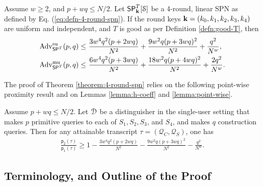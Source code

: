 \documentclass[journal=tosc,final,nohyperref]{iacrtrans}
\begin{document}
\begin{theorem}
	\label{theorem:4-round-spn}
	
	Assume $w\geq2$, and $p+wq\leq N/2$. Let $\mathsf{SP}_{\mathbf{k}}^T[\mathcal{S}]$ be a 4-round, linear SPN as defined by Eq. (\ref{eq:defn-4-round-spn}). If the round keys $\mathbf{k}=(k_0,k_1,k_2,k_3,k_4)$ are uniform and independent, and $T$ is good as per Definition \ref{defn:good-T}, then
	\begin{align}
	\operatorname{Adv}_{\mathsf{SP}^T}^{\mathrm{su}}(p, q) \leq~& 	\frac{3w^4q^2(p+2wq)}{N^2}+\frac{9w^2q(p+3wq)^2}{N^2}+\frac{q^2}{N^w},   
	\notag   \\
	\operatorname{Adv}_{\mathsf{SP}^T}^{\mathrm{mu}}(p, q) \leq~& \frac{6w^4q^2(p+3wq)}{N^2}+\frac{18w^2q(p+4wq)^2}{N^2}+\frac{2q^2}{N^w}.
	\notag
	\end{align}
\end{theorem}
The proof of Theorem \ref{theorem:4-round-spn} relies on the following point-wise proximity result and on Lemmas \ref{lemma:h-coeff} and \ref{lemma:point-wise}.


\begin{lemma}
	\label{lemma:proximity-4-round}
	
	Assume $p+wq\leq N/2$. Let $\mathcal{D}$ be a distinguisher in the single-user setting that makes $p$ primitive queries to each of $S_1,S_2,S_3$, and $S_4$, and makes $q$ construction queries. Then for any attainable
	transcript $\tau=(\mathcal{Q}_C,\mathcal{Q}_S)$, one has
	\begin{align}
	\frac{\mathsf{p}_{2}(\tau)}{\mathsf{p}_{1}(\tau)}
	\geq 1-
	\frac{3w^4q^2(p+2wq)}{N^2}-\frac{9w^2q(p+3wq)^2}{N^2}-\frac{q^2}{N^w}.
	\label{eq:bound-proximity-4-round}
	\end{align}
\end{lemma}




\subsection{Terminology, and Outline of the Proof}
\label{sec:proof-sketch-4-rounds}
\end{document}
